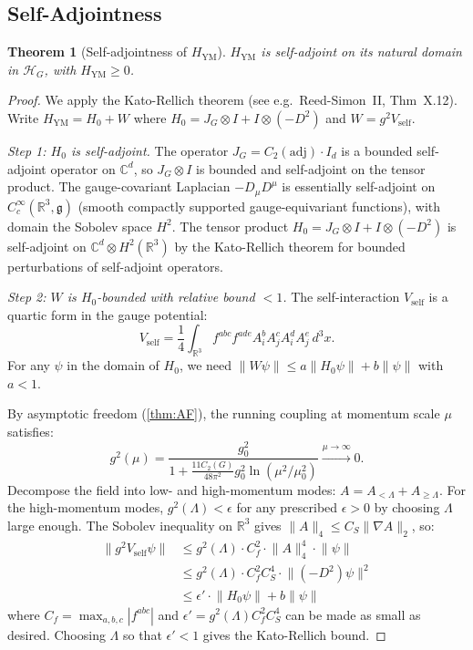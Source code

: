 \documentclass[11pt,a4paper]{article}
\theoremstyle{plain}
\newtheorem{theorem}{Theorem}[section]
\theoremstyle{remark}
\newcommand{\CC}{\mathbb{C}}
\newcommand{\R}{\mathbb{R}}
\newcommand{\HH}{\mathcal{H}}
\newcommand{\norm}[1]{\lVert #1 \rVert}
\newcommand{\adj}{\mathrm{adj}}
\begin{document}
\subsection{Self-Adjointness}

\begin{theorem}[Self-adjointness of $H_{\mathrm{YM}}$]
\label{thm:selfadjoint}
$H_{\mathrm{YM}}$ is self-adjoint on its natural domain in $\HH_G$, with
$H_{\mathrm{YM}} \geq 0$.
\end{theorem}

\begin{proof}
We apply the Kato-Rellich theorem (see e.g.\ Reed-Simon~II, Thm~X.12).
Write $H_{\mathrm{YM}} = H_0 + W$ where
$H_0 = J_G \otimes I + I \otimes (-D^2)$ and $W = g^2 V_{\mathrm{self}}$.

\smallskip\noindent\textit{Step 1: $H_0$ is self-adjoint.}
The operator $J_G = C_2(\adj) \cdot I_d$ is a bounded self-adjoint operator
on $\CC^d$, so $J_G \otimes I$ is bounded and self-adjoint on the tensor
product.  The gauge-covariant Laplacian $-D_\mu D^\mu$ is essentially
self-adjoint on $C_c^\infty(\R^3, \mathfrak{g})$ (smooth compactly supported
gauge-equivariant functions), with domain the Sobolev space $H^2$.
The tensor product $H_0 = J_G \otimes I + I \otimes (-D^2)$ is self-adjoint
on $\CC^d \otimes H^2(\R^3)$ by the Kato-Rellich theorem for bounded
perturbations of self-adjoint operators.

\smallskip\noindent\textit{Step 2: $W$ is $H_0$-bounded with relative bound $< 1$.}
The self-interaction $V_{\mathrm{self}}$ is a quartic form in the gauge
potential:
\[
  V_{\mathrm{self}} = \frac{1}{4}\int_{\R^3} f^{abc} f^{ade}
  A_i^b A_j^c A_i^d A_j^e \, d^3x.
\]
For any $\psi$ in the domain of $H_0$, we need
$\norm{W\psi} \leq a\norm{H_0\psi} + b\norm{\psi}$ with $a < 1$.

By asymptotic freedom (\cref{thm:AF}), the running coupling at
momentum scale $\mu$ satisfies:
\[
  g^2(\mu) = \frac{g_0^2}{1 + \frac{11 C_2(G)}{48\pi^2} g_0^2
  \ln(\mu^2/\mu_0^2)} \xrightarrow{\mu \to \infty} 0.
\]
Decompose the field into low- and high-momentum modes:
$A = A_{<\Lambda} + A_{\geq\Lambda}$.  For the high-momentum modes,
$g^2(\Lambda) < \epsilon$ for any prescribed $\epsilon > 0$ by choosing
$\Lambda$ large enough.  The Sobolev inequality on $\R^3$ gives
$\norm{A}_4 \leq C_S \norm{\nabla A}_2$, so:
\begin{align}
  \norm{g^2 V_{\mathrm{self}}\psi}
  &\leq g^2(\Lambda) \cdot C_f^2 \cdot \norm{A}_4^4 \cdot \norm{\psi}
  \nonumber\\
  &\leq g^2(\Lambda) \cdot C_f^2 C_S^4 \cdot
    \norm{(-D^2)\psi}^2 \nonumber\\
  &\leq \epsilon' \cdot \norm{H_0\psi} + b\norm{\psi}
  \label{eq:kato-rellich}
\end{align}
where $C_f = \max_{a,b,c} |f^{abc}|$ and $\epsilon' = g^2(\Lambda) C_f^2 C_S^4$
can be made as small as desired.  Choosing $\Lambda$ so that
$\epsilon' < 1$ gives the Kato-Rellich bound.


\end{proof}
\end{document}
